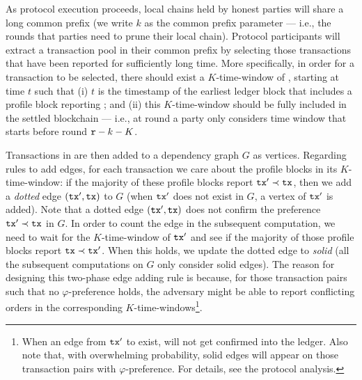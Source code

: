 As protocol execution proceeds, local chains held by honest parties will share a long common prefix (we write $k$ as the common prefix parameter --- i.e., the rounds that parties need to prune their local chain).
%
Protocol participants will extract a transaction pool \txpool in their common prefix by selecting those transactions that have been reported for sufficiently long time.
%
More specifically, in order for a transaction \tx to be selected, there should exist a $K$-time-window of \tx, starting at time $t$ such that (i) $t$ is the timestamp of the earliest ledger block that includes a profile block \PB reporting \tx; and (ii) this $K$-time-window should be fully included in the settled blockchain --- i.e., at round \round a party only considers time window that starts before round $\mathtt{r} - k - K$.

Transactions in \txpool are then added to a dependency graph $G$ as vertices.
%
Regarding rules to add edges, for each transaction \tx we care about the profile blocks in its $K$-time-window: if the majority of these profile blocks report $\mathtt{tx}' \prec \mathtt{tx}$, then we add a \emph{dotted} edge $(\mathtt{tx}', \mathtt{tx})$ to $G$ (when $\mathtt{tx}'$ does not exist in $G$, a vertex of $\mathtt{tx}'$ is added).
%
Note that a dotted edge $(\mathtt{tx}', \mathtt{tx})$ does not confirm the preference $\mathtt{tx}' \prec \mathtt{tx}$ in $G$.
%
In order to count the edge in the subsequent computation, we need to wait for the $K$-time-window of $\mathtt{tx}'$ and see if the majority of those profile blocks report $\mathtt{tx} \prec \mathtt{tx}'$.
%
When this holds, we update the dotted edge to \emph{solid} (all the subsequent computations on $G$ only consider solid edges).
%
The reason for designing this two-phase edge adding rule is because, for those transaction pairs such that no $\varphi$-preference holds, the adversary might be able to report conflicting orders in the corresponding $K$-time-windows\footnote{When an edge from $\mathtt{tx}'$ to \tx exist, \tx will not get confirmed into the ledger. Also note that, with overwhelming probability, solid edges will appear on those transaction pairs with $\varphi$-preference. For details, see the protocol analysis.}.

